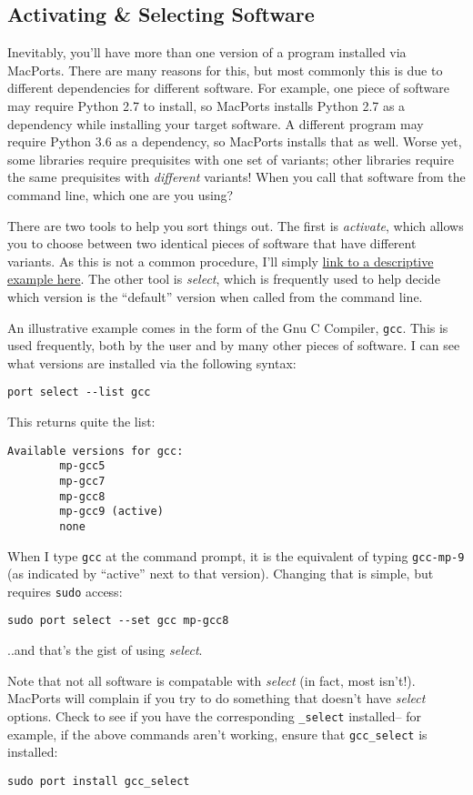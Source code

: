 \documentclass[12pt, letterpaper]{article}
\begin{document}
\subsection{Activating \& Selecting Software}
Inevitably, you'll have more than one version of a program installed via
MacPorts.
There are many reasons for this, but most commonly this is due to different
dependencies for different software.  For example, one piece of software
may require Python 2.7 to install, so MacPorts installs Python 2.7 as a
dependency
while installing your target software.  A different program may require
Python 3.6
as a dependency, so MacPorts installs that as well.  Worse yet, some libraries
require prequisites with one set of variants; other libraries require the same
prequisites with \emph{different} variants!  When you call that software from
the command line, which one are you using?

There are two tools to help you sort things out.  The first is \emph{activate},
which allows you to choose between two identical pieces of software that have
different variants.  As this is not a common procedure, I'll simply
\href{https://guide.macports.org/#using.port.upgrade}{link to a descriptive
  example here}.  The other tool is \emph{select}, which is frequently used
to help decide which version is the ``default'' version when called from
the command line.

An illustrative example comes in the form of the Gnu C Compiler, {\tt gcc}.
This is used frequently, both by the user and by many other pieces of software.
I can see what versions are installed via the following syntax:
\begin{verbatim}
port select --list gcc
\end{verbatim}
This returns quite the list:
\begin{verbatim}
Available versions for gcc:
        mp-gcc5
        mp-gcc7
        mp-gcc8
        mp-gcc9 (active)
        none
\end{verbatim}
When I type {\tt gcc} at the command prompt, it is the equivalent of typing
{\tt gcc-mp-9} (as indicated by ``active'' next to that version).  Changing
that is simple, but requires {\tt sudo} access:
\begin{verbatim}
sudo port select --set gcc mp-gcc8
\end{verbatim}
..and that's the gist of using \emph{select}.

Note that not all software is compatable with \emph{select} (in fact, most
isn't!).  MacPorts will complain if you try to do something that doesn't have
\emph{select} options.  Check to see if you have the corresponding
{\tt \*\_select} installed-- for example, if the above commands aren't working,
ensure that {\tt gcc\_select} is installed:
\begin{verbatim}
sudo port install gcc_select
\end{verbatim}
\end{document}
